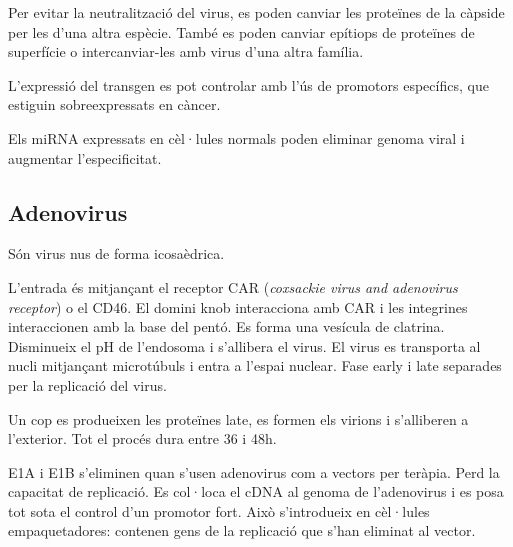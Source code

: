Per evitar la neutralització del virus, es poden canviar les proteïnes de la càpside per les d'una altra espècie. També es poden canviar epítiops de proteïnes de superfície o intercanviar-les amb virus d'una altra família.

L'expressió del transgen es pot controlar amb l'ús de promotors específics, que estiguin sobreexpressats en càncer.

Els miRNA expressats en cèl·lules normals poden eliminar genoma viral i augmentar l'especificitat.

\subsection{Adenovirus}
\label{sec:adenovirus}

Són virus nus de forma icosaèdrica. %

L'entrada és mitjançant el receptor CAR (\textit{coxsackie virus  and adenovirus receptor}) o el CD46. El domini knob interacciona amb CAR i les integrines interaccionen amb la base del pentó. Es forma una vesícula de clatrina. Disminueix el pH de l'endosoma i s'allibera el virus. El virus es transporta al nucli mitjançant microtúbuls i entra a l'espai nuclear. Fase early i late separades per la replicació del virus.

Un cop es produeixen les proteïnes late, es formen els virions i s'alliberen a l'exterior. Tot el procés dura entre 36 i 48h.


E1A i E1B s'eliminen quan s'usen adenovirus com a vectors per teràpia. Perd la capacitat de replicació. Es col·loca el cDNA al genoma de l'adenovirus i es posa tot sota el control d'un promotor fort. Això s'introdueix en cèl·lules empaquetadores: contenen gens de la replicació que s'han eliminat al vector.

